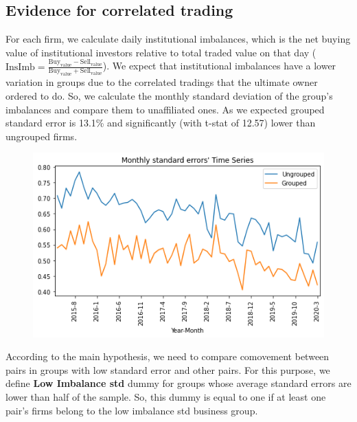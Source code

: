 \documentclass[12pt, a4paper]{article}
\begin{document}
\begin{table}[htbp]
	\centering
	\caption{\scriptsize}
	\label{Qmresult2subsanple}
	\resizebox{0.85\textwidth}{!}{
		
	}
\end{table}




\FloatBarrier


\subsection{Evidence for correlated trading }

 
For each firm, we calculate daily institutional imbalances, which is the net buying value of institutional investors relative to total traded value on that day ($ \text{InsImb} = \frac{\text{Buy}_{\text{value}} - \text{Sell}_{\text{value}}}{\text{Buy}_{\text{value}} + \text{Sell}_{\text{value}}} $). 
We expect that institutional imbalances have a lower variation in groups due to the correlated tradings that the ultimate owner ordered to do. So, we calculate the monthly standard deviation of the group's imbalances and compare them to unaffiliated ones. As we expected grouped standard error is  13.1\% and significantly (with t-stat of 12.57) lower than ungrouped firms. 

\begin{table}[htbp]
	\centering
	\resizebox{0.75\textwidth}{!}{
		
	}
	\label{tab:ImbalanceSummary}%
\end{table}%
\begin{figure}[htbp]
	\centering
	\includegraphics[width=0.8\linewidth]{GroupedSTD}
	\label{fig:GroupedSTD}
\end{figure}

According to the main hypothesis, we need to compare comovement between pairs in groups with low standard error and other pairs.
For this purpose, we define \textbf{Low Imbalance std} dummy for groups whose average standard errors are lower than half of the sample. 
So, this dummy is equal to one if at least one pair's firms belong to the low imbalance std business group.
\begin{table}[htbp]
	\centering
	\resizebox{\textwidth}{!}{
		
	}
\end{table}
\FloatBarrier
\end{document}
